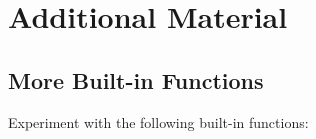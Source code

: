 \begin{comment} %
\begin{problem} %
Download \texttt{matrix\_multiply.py} and \texttt{matrices.npz}.
The Python file \texttt{matrix\_multiply.py} is a module that has three functions for multiplying two matrices together, called \li{method1()}, \li{method2()}, and \li{method3()}.
It also has a \li{load\_matrices()} function that returns two matrices from \texttt{matrices.npz}.

Modify your solutions file so that when it is run from a Python interpreter (but not when it is imported), the following is executed:
\begin{enumerate}
\item If no command line arguments are given, print ``No Input."
\item If anything other than ``matrices.npz'' is given, print ``Incorrect Input."
\item If ``matrices.npz'' is given as a command line argument, load two matrices from \texttt{matrices.npz}. Time (separately) how long each method takes to multiply the two matrices together, then print the results.

(Hint: Read the code in \texttt{matrix\_multiply.py}, especially the function docstrings, to determine how to use each function.)
\end{enumerate}
\end{problem}
\end{comment}

\newpage

\section*{Additional Material} %

\subsection*{More Built-in Functions} %

Experiment with the following built-in functions:


